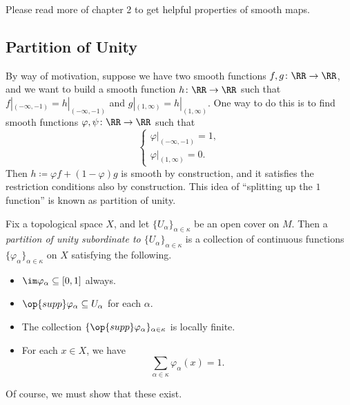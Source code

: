 \documentclass[../notes.tex]{subfiles}
\begin{document}
\begin{remark}
	Please read more of chapter 2 to get helpful properties of smooth maps.
\end{remark}

\subsection{Partition of Unity}
By way of motivation, suppose we have two smooth functions $f,g\colon\RR\to\RR$, and we want to build a smooth function $h\colon\RR\to\RR$ such that $f|_{(-\infty,-1)}=h|_{(-\infty,-1)}$ and $g|_{(1,\infty)}=h|_{(1,\infty)}$. One way to do this is to find smooth functions $\varphi,\psi\colon\RR\to\RR$ such that 
\[\begin{cases}
	\varphi|_{(-\infty,-1)}=1, \\
	\varphi|_{(1,\infty)}=0.
\end{cases}\]
Then $h\coloneqq\varphi f+(1-\varphi)g$ is smooth by construction, and it satisfies the restriction conditions also by construction. This idea of ``splitting up the $1$ function'' is known as partition of unity.
\begin{definition}
	Fix a topological space $X$, and let $\{U_\alpha\}_{\alpha\in\kappa}$ be an open cover on $M$. Then a \textit{partition of unity subordinate to $\{U_\alpha\}_{\alpha\in\kappa}$} is a collection of continuous functions $\{\varphi_\alpha\}_{\alpha\in\kappa}$ on $X$ satisfying the following.
	\begin{itemize}
		\item $\im\varphi_\alpha\subseteq[0,1]$ always.
		\item $\op{supp}\varphi_\alpha\subseteq U_\alpha$ for each $\alpha$.
		\item The collection $\{\op{supp}\varphi_\alpha\}_{\alpha\in\kappa}$ is locally finite.
		\item For each $x\in X$, we have
		\[\sum_{\alpha\in\kappa}\varphi_\alpha(x)=1.\]
	\end{itemize}
\end{definition}
Of course, we must show that these exist.
\end{document}
